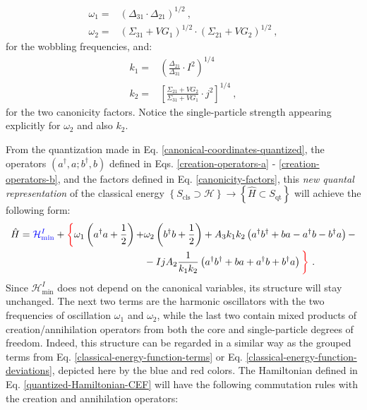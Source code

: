 \begin{align}
    \omega_1=&\left(\Delta_{31}\cdot\Delta_{21}\right)^{1/2}\ ,\nonumber\\
    \omega_2=&\left(\Sigma_{31}+VG_1\right)^{1/2}\cdot\left(\Sigma_{21}+VG_2\right)^{1/2}\ ,
\end{align}
for the wobbling frequencies, and:
\begin{align}
    k_1=&\left(\frac{\Delta_{21}}{\Delta_{31}}\cdot I^2\right)^{1/4}\, \nonumber\\
    k_2=&\left[\frac{\Sigma_{21}+VG_2}{\Sigma_{31}+VG_1}\cdot j^2\right]^{1/4}\ ,
\end{align}
for the two canonicity factors. Notice the single-particle strength appearing explicitly for $\omega_2$ and also $k_2$.

From the quantization made in Eq. \ref{canonical-coordinates-quantized}, the operators $(a^\dagger,a;b^\dagger,b)$ defined in Eqs. \ref{creation-operators-a} - \ref{creation-operators-b}, and the factors defined in Eq. \ref{canonicity-factors}, this \emph{new quantal representation} of the classical energy $\left\{S_\text{cls}\supset\mathcal{H}\right\}\to\left\{\hat{H}\subset S_\text{qt}\right\}$ will achieve the following form:
\begin{align}
    \hat{H}={\color{blue}\mathcal{H}_\text{min}^I}+{\color{red}\bigg\{}\omega_1\left(a^\dagger a+\frac{1}{2}\right)+&\omega_2\left(b^\dagger b+\frac{1}{2}\right)+A_3k_1k_2\left(a^\dagger b^\dagger+ba-a^\dagger b-b^\dagger a\right)-\nonumber\\
                                                                                &-IjA_2\frac{1}{k_1k_2}\left(a^\dagger b^\dagger + ba + a^\dagger b + b^\dagger a \right){\color{red}\bigg\}}\ .
    \label{quantized-Hamiltonian-CEF}
\end{align}
Since $\mathcal{H}_\text{min}^I$ does not depend on the canonical variables, its structure will stay unchanged. The next two terms are the harmonic oscillators with the two frequencies of oscillation $\omega_1$ and $\omega_2$, while the last two contain mixed products of creation/annihilation operators from both the core and single-particle degrees of freedom. Indeed, this structure can be regarded in a similar way as the grouped terms from Eq. \ref{classical-energy-function-terms} or Eq. \ref{classical-energy-function-deviations}, depicted here by the blue and red colors. The Hamiltonian defined in Eq. \ref{quantized-Hamiltonian-CEF} will have the following commutation rules with the creation and annihilation operators:
